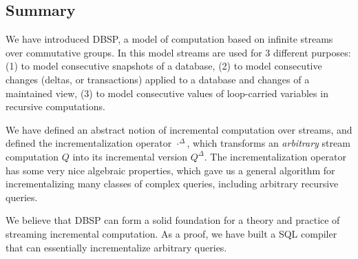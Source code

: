 \documentclass[twocolumn
]{svjour3}
\numberwithin{equation}{section}
\newcommand{\dbsp}{DBSP\xspace}
\newcommand{\inc}[1]{{#1}^{\Delta}}
\begin{document}
\subsection{Summary}

We have introduced \dbsp, a model of computation based on infinite
streams over commutative groups.  In this model streams are used for 3
different purposes: (1) to model consecutive snapshots of a database,
(2) to model consecutive changes (deltas, or transactions) applied to
a database and changes of a maintained view, (3) to model consecutive
values of loop-carried variables in recursive computations.

We have defined an abstract notion of incremental computation over
streams, and defined the incrementalization operator $\inc{\cdot}$,
which transforms an \emph{arbitrary} stream computation $Q$ into its
incremental version $\inc{Q}$.  The incrementalization operator has
some very nice algebraic properties, which gave us a general algorithm
for incrementalizing many classes of complex queries, including
arbitrary recursive queries.

We believe that \dbsp can form a solid foundation for a theory and
practice of streaming incremental computation.  As a proof, we have
built a SQL compiler that can essentially incrementalize arbitrary
queries.

\newpage



\end{document}
